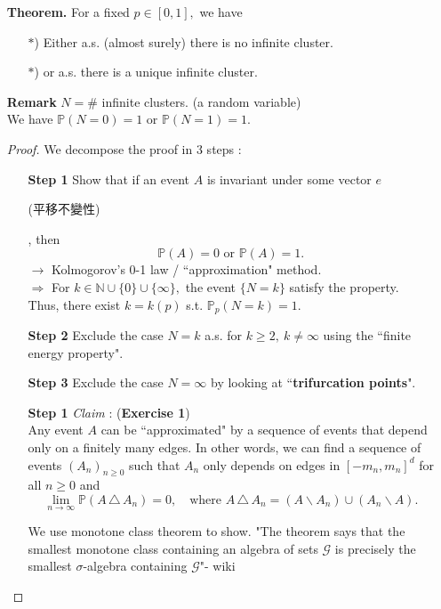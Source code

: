 \documentclass[12pt,a4paper]{article}
\newcommand{\SOL}{\fbox{ \tt s\parbox[b][2pt][c]{6pt}{o}\hspace*{-7pt} L:}}
\begin{document}
\begin{enumerate}
	\item[\textbf{Theorem.}] For a fixed $p\in [0,1],$ we have 
	\begin{enumerate}
		\item[$*$)] Either a.s. (almost surely) there is no infinite cluster.
		\item[$*$)] or a.s. there is a unique infinite cluster.
	\end{enumerate}
	\item[\textbf{Remark}] $N=\#$ infinite clusters. (a random variable)\\
	We have $\mathbb{P}(N=0)=1$ or $\mathbb{P}(N=1)=1.$
	\begin{proof}
	We decompose the proof in 3 steps :\\
	\noindent\makebox[\linewidth]{\rule{\textwidth}{0.4pt}}
	\begin{enumerate}
		\item[\textbf{Step 1}] Show that if an event $A$ is invariant under some vector $e$ \begin{CJK}{UTF8}{bkai}(平移不變性)\end{CJK}, then 
		\[
		\mathbb{P}(A)=0\mbox{ or }\mathbb{P}(A)=1.
		\]
		$\rightarrow$ Kolmogorov's 0-1 law / ``approximation" method.\\
		$\Rightarrow$ For $k\in\mathbb{N}\cup\{0\}\cup\{\infty\},$ the event $\{N=k\}$ satisfy the property. Thus, there exist $k=k(p)$ s.t. $\mathbb{P}_p(N=k)=1.$
		\item[\textbf{Step 2}] Exclude the case $N=k$ a.s. for $k\geq 2,\ k\neq \infty$ using the ``finite energy property".
		\item[\textbf{Step 3}] Exclude the case $N=\infty$ by looking at ``\textbf{trifurcation points}".
	\end{enumerate}
	\noindent\makebox[\linewidth]{\rule{\textwidth}{0.4pt}}
	\begin{enumerate}
		\item[\textbf{Step 1}] \textit{Claim} : (\textbf{Exercise 1})\\
		Any event $A$ can be ``approximated" by a sequence of events that depend only on a finitely many edges. In other words, we can find a sequence of events $(A_n)_{n\geq 0}$ such that $A_n$ only depends on edges in $[-m_n,m_n]^d$ for all $n\geq 0$ and 
		\[
		\lim_{n\to\infty}\mathbb{P}(A\,\triangle\, A_n)=0,\quad \mbox{where } A\,\triangle\, A_n=(A\backslash A_n)\cup (A_n\backslash A).
		\]
		\item[\SOL] We use monotone class theorem to show. "The theorem says that the smallest monotone class containing an algebra of sets $\mathcal{G}$ is precisely the smallest $\sigma$-algebra containing $\mathcal{G}$"- wiki
	

\end{enumerate}
\end{proof}
\end{enumerate}
\end{document}
